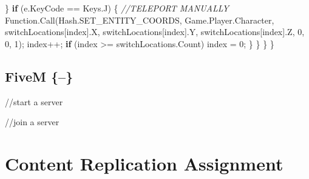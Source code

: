 \documentclass[
  openany]{book}
\newenvironment{Shaded}{\begin{snugshade}}{\end{snugshade}}
\newcommand{\CommentTok}[1]{\textcolor[rgb]{0.56,0.35,0.01}{\textit{#1}}}
\newcommand{\DecValTok}[1]{\textcolor[rgb]{0.00,0.00,0.81}{#1}}
\newcommand{\FunctionTok}[1]{\textcolor[rgb]{0.00,0.00,0.00}{#1}}
\newcommand{\KeywordTok}[1]{\textcolor[rgb]{0.13,0.29,0.53}{\textbf{#1}}}
\newcommand{\NormalTok}[1]{#1}
\begin{document}
\begin{Shaded}
\begin{Highlighting}[]
\NormalTok{           \}}
           \KeywordTok{if}\NormalTok{ (e.}\FunctionTok{KeyCode}\NormalTok{ == Keys.}\FunctionTok{J}\NormalTok{)}
\NormalTok{           \{}
              \CommentTok{//TELEPORT MANUALLY}
\NormalTok{              Function.}\FunctionTok{Call}\NormalTok{(Hash.}\FunctionTok{SET_ENTITY_COORDS}\NormalTok{, Game.}\FunctionTok{Player}\NormalTok{.}\FunctionTok{Character}\NormalTok{, switchLocations[index].}\FunctionTok{X}\NormalTok{, switchLocations[index].}\FunctionTok{Y}\NormalTok{, switchLocations[index].}\FunctionTok{Z}\NormalTok{, }\DecValTok{0}\NormalTok{, }\DecValTok{0}\NormalTok{, }\DecValTok{1}\NormalTok{);}
\NormalTok{              index++;}
              \KeywordTok{if}\NormalTok{ (index >= switchLocations.}\FunctionTok{Count}\NormalTok{) index = }\DecValTok{0}\NormalTok{;}
\NormalTok{            \}}
\NormalTok{        \}}
\NormalTok{    \}}
\NormalTok{\}}


\end{Highlighting}
\end{Shaded}

\hypertarget{fivem}{%
\subsection{FiveM \{--\}}\label{fivem}}

//start a server

//join a server

\hypertarget{content-replication-assignment-7}{%
\section*{Content Replication Assignment}\label{content-replication-assignment-7}}
\end{document}
